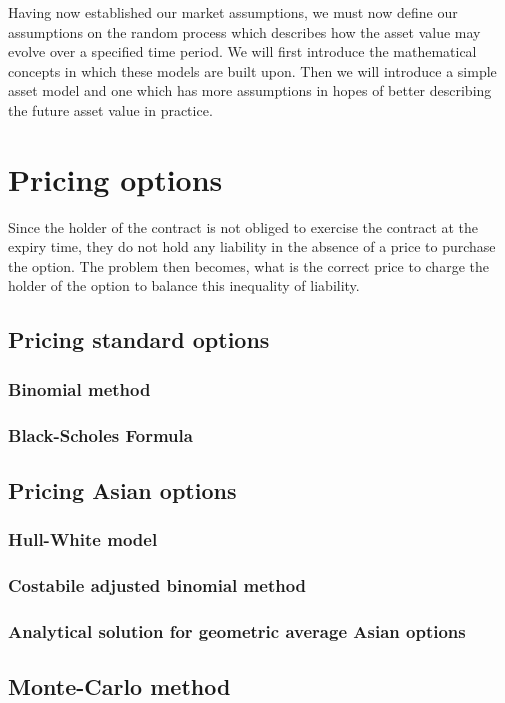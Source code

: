 Having now established our market assumptions, we must now define our assumptions on the random process which describes how the asset value may evolve over a specified time period. We will first introduce the mathematical concepts in which these models are built upon. Then we will introduce a simple asset model and one which has more assumptions in hopes of better describing the future asset value in practice.

\section{Pricing options}

Since the holder of the contract is not obliged to exercise the contract at the expiry time, they do not hold any liability in the absence of a price to purchase the option. The problem then becomes, what is the correct price to charge the holder of the option to balance this inequality of liability.

\subsection{Pricing standard options}

\subsubsection{Binomial method}

\subsubsection{Black-Scholes Formula}

\subsection{Pricing Asian options}

\subsubsection{Hull-White model}

\subsubsection{Costabile adjusted binomial method}

\subsubsection{Analytical solution for geometric average Asian options}

\subsection{Monte-Carlo method}